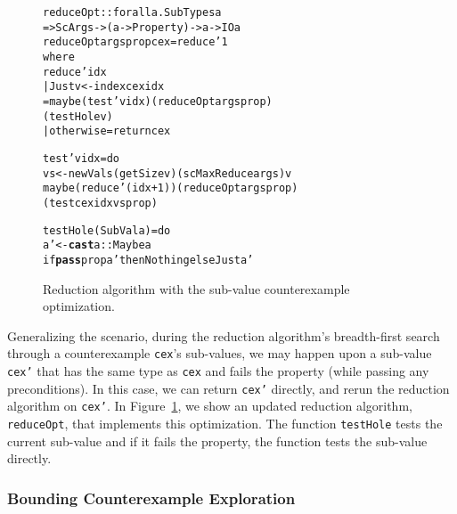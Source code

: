 \documentclass{sigplanconf}
\newenvironment{code}{\begin{alltt}\footnotesize}{\end{alltt}}
\newcommand{\ttp}[1]{\texttt{#1}}
\newcommand{\undef}[1]{{\bf #1}}
\begin{document}

\begin{figure}
\begin{code}
reduceOpt :: forall a . SubTypes a
  => ScArgs -> (a -> Property) -> a -> IO a
reduceOpt args prop cex = reduce' 1
  where
  reduce' idx
    | Just v <- index cex idx
    = maybe (test' v idx) (reduceOpt args prop)
            (testHole v)
    | otherwise = return cex

  test' v idx = do
    vs <- newVals (getSize v) (scMaxReduce args) v
    maybe (reduce' (idx+1)) (reduceOpt args prop)
          (test cex idx vs prop)

  testHole (SubVal a) = do
    a' <- \undef{cast} a :: Maybe a
    if \undef{pass} prop a' then Nothing else Just a'
\end{code}
  \caption{Reduction algorithm with the sub-value counterexample optimization.}
  \label{fig:reduce0}
\end{figure}

Generalizing the scenario, during the reduction algorithm's breadth-first
search through a counterexample \ttp{cex}'s sub-values, we may happen upon a
sub-value \ttp{cex'} that has the same type as \ttp{cex} and fails the property
(while passing any preconditions).  In this case, we can return \ttp{cex'}
directly, and rerun the reduction algorithm on \ttp{cex'}.  In
Figure~\ref{fig:reduce0}, we show an updated reduction algorithm, \ttp{reduceOpt},
that implements this optimization.  The function \ttp{testHole} tests the
current sub-value and if it fails the property, the function tests the sub-value
directly.


\subsubsection{Bounding Counterexample Exploration}
\end{document}
